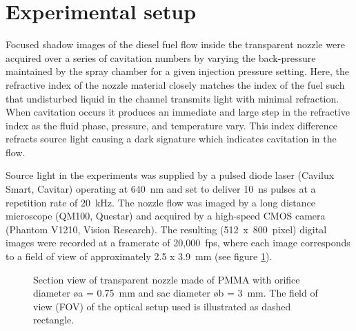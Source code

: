 \documentclass[letterpaper,twocolumn,10pt]{ilass}
\begin{document}
\section*{Experimental setup}
Focused shadow images of the diesel fuel flow inside the transparent nozzle
were acquired over a series of cavitation numbers by varying
the back-pressure maintained by the spray chamber for a given injection pressure
setting.
%
Here, the refractive index of the nozzle material closely matches the index of the fuel such that undisturbed liquid in the channel transmits light with minimal refraction.
When cavitation occurs it produces an immediate and large step in the refractive index
as the fluid phase, pressure, and temperature vary. This index difference refracts source
light causing a dark signature which indicates cavitation in the flow.
%

Source light in the experiments was supplied by a pulsed diode laser (Cavilux Smart, Cavitar)
operating at 640~nm and set to deliver 10~ns pulses at a repetition rate of 20~kHz.
%
The nozzle flow was imaged by a long distance microscope (QM100, Questar)
and acquired by a high-speed CMOS camera (Phantom V1210, Vision Research).
%
The resulting (512~x~800~pixel) digital images were recorded at a framerate of 20,000~fps,
where each image corresponds to a field of view of approximately 2.5 x 3.9~mm (see figure \ref{fig3}). 
%
\begin{figure}[h]
\begin{center}
\end{center}
\vspace*{-10mm}
\caption{Section view of transparent nozzle made of PMMA with orifice diameter
         \o a = 0.75~mm and sac diameter \o b = 3~mm. The field of view (FOV)
				 of the optical setup used is illustrated as dashed rectangle.}
\label{fig3} 
\end{figure}
%
\end{document}
